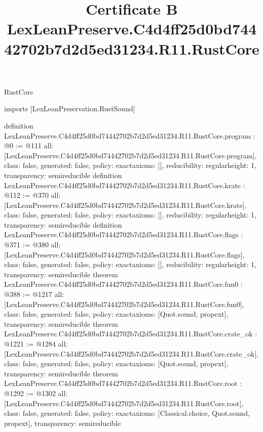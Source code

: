 \begin{lexlean}{RustCore}
\title{Certificate B LexLeanPreserve.C4d4ff25d0bd74442702b7d2d5ed31234.R11.RustCore}
\begin{coremodule}
imports [LexLeanPreservation.RustSound]

definition LexLeanPreserve.C4d4ff25d0bd74442702b7d2d5ed31234.R11.RustCore.program : @0 := @111 {
  all: [LexLeanPreserve.C4d4ff25d0bd74442702b7d2d5ed31234.R11.RustCore.program],
  class: false,
  generated: false,
  policy: exact{axioms: []},
  reducibility: regular{height: 1},
  transparency: semireducible
}
definition LexLeanPreserve.C4d4ff25d0bd74442702b7d2d5ed31234.R11.RustCore.krate : @112 := @370 {
  all: [LexLeanPreserve.C4d4ff25d0bd74442702b7d2d5ed31234.R11.RustCore.krate],
  class: false,
  generated: false,
  policy: exact{axioms: []},
  reducibility: regular{height: 1},
  transparency: semireducible
}
definition LexLeanPreserve.C4d4ff25d0bd74442702b7d2d5ed31234.R11.RustCore.flags : @371 := @380 {
  all: [LexLeanPreserve.C4d4ff25d0bd74442702b7d2d5ed31234.R11.RustCore.flags],
  class: false,
  generated: false,
  policy: exact{axioms: []},
  reducibility: regular{height: 1},
  transparency: semireducible
}
theorem LexLeanPreserve.C4d4ff25d0bd74442702b7d2d5ed31234.R11.RustCore.fun0 : @388 := @1217 {
  all: [LexLeanPreserve.C4d4ff25d0bd74442702b7d2d5ed31234.R11.RustCore.fun0],
  class: false,
  generated: false,
  policy: exact{axioms: [Quot.sound, propext]},
  transparency: semireducible
}
theorem LexLeanPreserve.C4d4ff25d0bd74442702b7d2d5ed31234.R11.RustCore.crate_ok : @1221 := @1284 {
  all: [LexLeanPreserve.C4d4ff25d0bd74442702b7d2d5ed31234.R11.RustCore.crate_ok],
  class: false,
  generated: false,
  policy: exact{axioms: [Quot.sound, propext]},
  transparency: semireducible
}
theorem LexLeanPreserve.C4d4ff25d0bd74442702b7d2d5ed31234.R11.RustCore.root : @1292 := @1302 {
  all: [LexLeanPreserve.C4d4ff25d0bd74442702b7d2d5ed31234.R11.RustCore.root],
  class: false,
  generated: false,
  policy: exact{axioms: [Classical.choice, Quot.sound, propext]},
  transparency: semireducible
}


\end{coremodule}
\end{lexlean}
